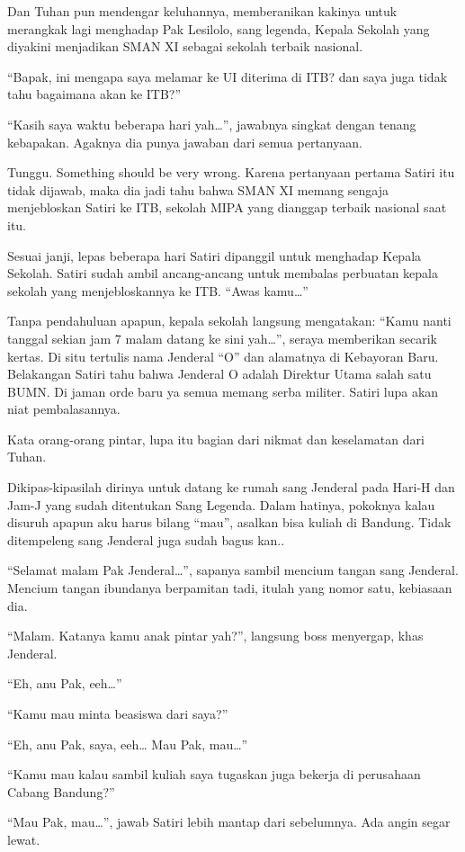 Dan Tuhan pun mendengar keluhannya, memberanikan kakinya untuk merangkak lagi menghadap Pak Lesilolo, sang legenda, Kepala Sekolah yang diyakini menjadikan SMAN XI sebagai sekolah terbaik nasional.

“Bapak, ini mengapa saya melamar ke UI diterima di ITB? dan saya juga tidak tahu bagaimana akan ke ITB?”

“Kasih saya waktu beberapa hari yah…”, jawabnya singkat dengan tenang kebapakan. Agaknya dia punya jawaban dari semua pertanyaan.

Tunggu. Something should be very wrong. Karena pertanyaan pertama Satiri itu tidak dijawab, maka dia jadi tahu bahwa SMAN XI memang sengaja menjebloskan Satiri ke ITB, sekolah MIPA yang dianggap terbaik nasional saat itu.

Sesuai janji, lepas beberapa hari Satiri dipanggil untuk menghadap Kepala Sekolah. Satiri sudah ambil ancang-ancang untuk membalas perbuatan kepala sekolah yang menjebloskannya ke ITB. “Awas kamu…”

Tanpa pendahuluan apapun, kepala sekolah langsung mengatakan: “Kamu nanti tanggal sekian jam 7 malam datang ke sini yah…”, seraya memberikan secarik kertas. Di situ tertulis nama Jenderal “O” dan alamatnya di Kebayoran Baru. Belakangan Satiri tahu bahwa Jenderal O adalah Direktur Utama salah satu BUMN. Di jaman orde baru ya semua memang serba militer. Satiri lupa akan niat pembalasannya.

Kata orang-orang pintar, lupa itu bagian dari nikmat dan keselamatan dari Tuhan.

Dikipas-kipasilah dirinya untuk datang ke rumah sang Jenderal pada Hari-H dan Jam-J yang sudah ditentukan Sang Legenda. Dalam hatinya, pokoknya kalau disuruh apapun aku harus bilang “mau”, asalkan bisa kuliah di Bandung. Tidak ditempeleng sang Jenderal juga sudah bagus kan..

“Selamat malam Pak Jenderal…”, sapanya sambil mencium tangan sang Jenderal. Mencium tangan ibundanya berpamitan tadi, itulah yang nomor satu, kebiasaan dia.

“Malam. Katanya kamu anak pintar yah?”, langsung boss menyergap, khas Jenderal.

“Eh, anu Pak, eeh…”

“Kamu mau minta beasiswa dari saya?”

“Eh, anu Pak, saya, eeh… Mau Pak, mau…”

“Kamu mau kalau sambil kuliah saya tugaskan juga bekerja di perusahaan Cabang Bandung?”

“Mau Pak, mau…”, jawab Satiri lebih mantap dari sebelumnya. Ada angin segar lewat.

